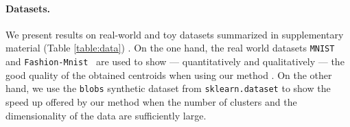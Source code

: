 \paragraph{Datasets.}
We present results on real-world and toy datasets summarized in supplementary material (Table \ref{table:data}) . On the one hand, the real world datasets \texttt{MNIST}~\cite{lecun-mnisthandwrittendigit-2010} and \texttt{Fashion-Mnist}~\cite{Pedregosa2011Scikit} %
are used to show --- quantitatively and qualitatively --- the good quality of the obtained centroids when using our method \qkmeans. On the other hand, we use the \texttt{blobs} synthetic dataset from \texttt{sklearn.dataset} to show the speed up offered by our method \qkmeans when the number of clusters and the dimensionality of the data are sufficiently large.




